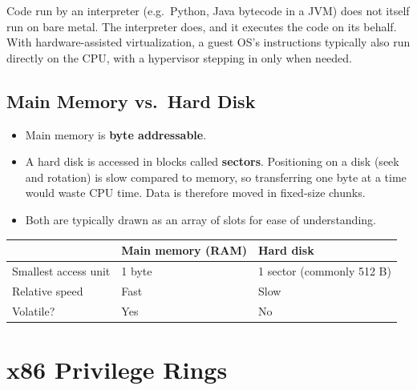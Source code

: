 \documentclass{article}
\begin{document}
\begin{extra}
	Code run by an interpreter (e.g.\ Python, Java bytecode in a JVM) does not itself run on bare metal. The interpreter does, and it executes the code on its behalf. With hardware-assisted virtualization, a guest OS's instructions typically also run directly on the CPU, with a hypervisor stepping in only when needed.
\end{extra}

\subsection{Main Memory vs.\ Hard Disk}
\begin{itemize}
	\item Main memory is \textbf{byte addressable}.
	\item A hard disk is accessed in blocks called \textbf{sectors}. Positioning on a disk (seek and rotation) is slow compared to memory, so transferring one byte at a time would waste CPU time. Data is therefore moved in fixed-size chunks.
	\item Both are typically drawn as an array of slots for ease of understanding.
\end{itemize}

\begin{table}[H]
	\centering
	\begin{tabular}{lll}
		\toprule
		 & \textbf{Main memory (RAM)} & \textbf{Hard disk} \\
		\midrule
		Smallest access unit & 1 byte & 1 sector (commonly 512 B) \\
		Relative speed & Fast & Slow \\
		Volatile? & Yes & No \\
		\bottomrule
	\end{tabular}
\end{table}

\section{x86 Privilege Rings}
\label{sec:rings}
\end{document}
